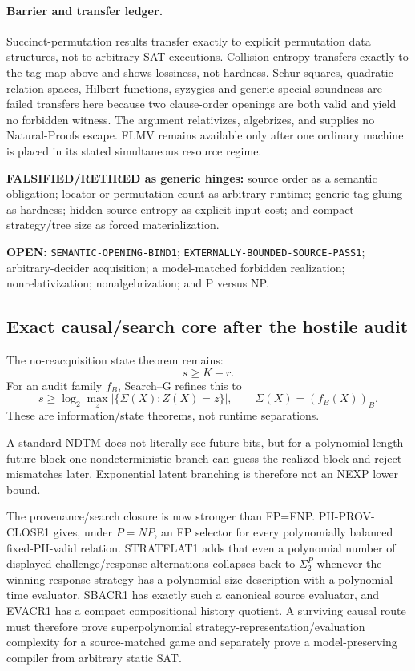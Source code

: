 \documentclass[11pt]{article}
\begin{document}
\paragraph{Barrier and transfer ledger.}
Succinct-permutation results transfer exactly to explicit permutation data
structures, not to arbitrary SAT executions.  Collision entropy transfers
exactly to the tag map above and shows lossiness, not hardness.  Schur squares,
quadratic relation spaces, Hilbert functions, syzygies and generic
special-soundness are failed transfers here because two clause-order openings
are both valid and yield no forbidden witness.  The argument relativizes,
algebrizes, and supplies no Natural-Proofs escape.  FLMV remains available
only after one ordinary machine is placed in its stated simultaneous resource
regime.

\textbf{FALSIFIED/RETIRED as generic hinges:} source order as a semantic
obligation; locator or permutation count as arbitrary runtime; generic tag
gluing as hardness; hidden-source entropy as explicit-input cost; and compact
strategy/tree size as forced materialization.

\textbf{OPEN:} \texttt{SEMANTIC-OPENING-BIND1};
\texttt{EXTERNALLY-BOUNDED-SOURCE-PASS1}; arbitrary-decider acquisition;
a model-matched forbidden realization; nonrelativization; nonalgebrization;
and P versus NP.

\subsection{Exact causal/search core after the hostile audit}

The no-reacquisition state theorem remains:
\[
\boxed{s\ge K-r.}
\]
For an audit family \(f_B\), Search--G refines this to
\[
\boxed{
s\ge
\log_2\max_z
\left|\{\Sigma(X):Z(X)=z\}\right|,
\qquad
\Sigma(X)=(f_B(X))_B.
}
\]
These are information/state theorems, not runtime separations.

A standard NDTM does not literally see future bits, but for a polynomial-length future block one
nondeterministic branch can guess the realized block and reject mismatches later. Exponential latent
branching is therefore not an NEXP lower bound.

The provenance/search closure is now stronger than FP=FNP. PH-PROV-CLOSE1 gives, under \(P=NP\),
an FP selector for every polynomially balanced fixed-PH-valid relation. STRATFLAT1 adds that even a
polynomial number of displayed challenge/response alternations collapses back to \(\Sigma_2^P\)
whenever the winning response strategy has a polynomial-size description with a polynomial-time
evaluator. SBACR1 has exactly such a canonical source evaluator, and EVACR1 has a compact
compositional history quotient. A surviving causal route must therefore prove superpolynomial
strategy-representation/evaluation complexity for a source-matched game and separately prove a
model-preserving compiler from arbitrary static SAT.
\end{document}
